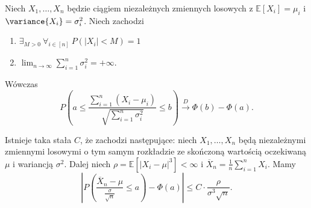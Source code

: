 \begin{theorem}
    Niech $X_1,\ldots,X_n$ będzie ciągiem niezależnych zmiennych losowych z $\mathbb{E}\left[ X_i \right] = \mu_i$ i $\variance{X_i} = \sigma_i^2$. Niech zachodzi
    \begin{enumerate}
        \item $\exists_{M>0} \ \forall_{i \in [n]} \ P\left( \left|X_i\right|<M \right) = 1 $
        \item $ \lim_{n \to \infty} \sum_{i=1}^{n} \sigma_i^2 = +\infty$.
    \end{enumerate}
    Wówczas $$ P\left( a \le \frac{ \sum_{i=1}^{n} \left( X_i - \mu_i \right) }{\sqrt{ \sum_{i=1}^{n} \sigma_i^2} } \le  b  \right) \xrightarrow{D} \Phi\left( b  \right) - \Phi\left( a  \right) . $$ 
\end{theorem}

\begin{theorem}
    Istnieje taka stała $C$, że zachodzi następujące: niech $X_1,\ldots,X_n$ będą niezależnymi zmiennymi losowymi o tym samym rozkładzie ze skończoną wartością oczekiwaną $\mu$ i wariancją $\sigma^2$. Dalej niech $\rho = \mathbb{E}\left[ \left|X_i-\mu\right|^3 \right] < \infty $ i $\overline{X}_{n} = \frac{1}{n} \sum_{i=1}^{n} X_i$. Mamy
    $$ \left|P\left( \frac{\overline{X}_{n}-\mu}{\frac{\sigma}{\sqrt{n} }} \le a \right) - \Phi\left( a  \right) \right| \le C\cdot \frac{\rho}{\sigma^3 \sqrt{n} } .$$ 
\end{theorem}

